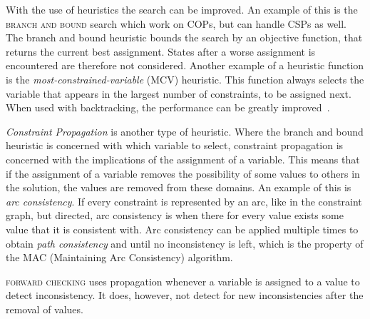 With the use of heuristics the search can be improved. An example of this is the \textsc{branch and bound} search which work on COPs, but can handle CSPs as well. The branch and bound heuristic bounds the search by an objective function, that returns the current best assignment. States after a worse assignment is encountered are therefore not considered. Another example of a heuristic function is the \emph{most-constrained-variable} (MCV) heuristic. This function always selects the variable that appears in the largest number of constraints, to be assigned next. When used with backtracking, the performance can be greatly improved~\cite[pp. 337]{CPApt}.

\emph{Constraint Propagation} is another type of heuristic. Where the branch and bound heuristic is concerned with which variable to select, constraint propagation is concerned with the implications of the assignment of a variable. This means that if the assignment of a variable removes the possibility of some values to others in the solution, the values are removed from these domains. An example of this is \emph{arc consistency}. If every constraint is represented by an arc, like in the constraint graph, but directed, arc consistency is when there for every value exists some value that it is consistent with. Arc consistency can be applied multiple times to obtain \textit{path consistency} and until no inconsistency is left, which is the property of the \textsc{MAC} (Maintaining Arc Consistency) algorithm.

\textsc{forward checking} uses propagation whenever a variable is assigned to a value to detect inconsistency. It does, however, not detect for new inconsistencies after the removal of values.

